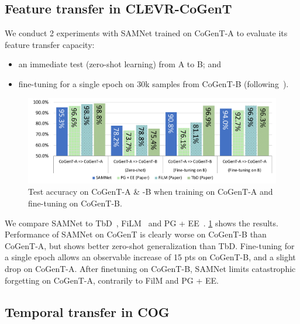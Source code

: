\subsection{Feature transfer in CLEVR-CoGenT}
\label{sec:feature}


We conduct 2 experiments with SAMNet trained on CoGenT-A to evaluate its feature transfer capacity:
\begin{itemize}
\compresslist
\item an immediate test (zero-shot learning) from A to B; and
\item fine-tuning for a single epoch on 30k samples from CoGenT-B (following~\cite{johnson2017inferring, mascharka2018transparency, perez2018film, marois2018transfer}).
\end{itemize}

\begin{figure}[htbp]
	\centering
	\includegraphics[width=\columnwidth]{../img/plots/cogent_feature_transfer_baselines.pdf}
	\caption{Test accuracy on CoGenT-A \& -B when training on CoGenT-A and fine-tuning on CoGenT-B.}
	\label{fig:CoGenT-B-results}
\end{figure}

We compare SAMNet to TbD~\cite{mascharka2018transparency}, FiLM~\cite{perez2018film} and PG + EE~\cite{johnson2017inferring}. \cref{fig:CoGenT-B-results} shows the results. Performance of SAMNet on CoGenT is clearly worse on CoGenT-B than CoGenT-A, but shows better zero-shot generalization than TbD. Fine-tuning for a single epoch allows an observable increase of 15 pts on CoGenT-B, and a slight drop on CoGenT-A. After finetuning on CoGenT-B, SAMNet limits catastrophic forgetting on CoGenT-A, contrarily to FilM and PG + EE.

\subsection{Temporal transfer in COG}
\label{sec:temporal}

